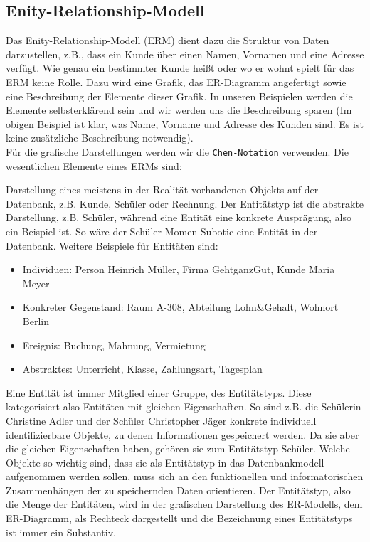 \subsection[Grundlagen]{Enity-Relationship-Modell}
Das Enity-Relationship-Modell (ERM) dient dazu die Struktur von Daten darzustellen, z.B., dass ein Kunde über einen Namen, Vornamen und eine Adresse verfügt. Wie genau ein bestimmter Kunde heißt oder wo er wohnt spielt für das ERM keine Rolle. Dazu wird eine Grafik, das ER-Diagramm angefertigt sowie eine Beschreibung der Elemente dieser Grafik. In unseren Beispielen werden die Elemente selbsterklärend sein und wir werden uns die Beschreibung sparen (Im obigen Beispiel ist klar, was Name, Vorname und Adresse des Kunden sind. Es ist keine zusätzliche Beschreibung notwendig).\\
Für die grafische Darstellungen werden wir die \texttt{Chen-Notation} verwenden. Die wesentlichen Elemente eines ERMs sind:
\begin{tcolorbox}[title=Entitätstypen und Entitäten]
	Darstellung eines meistens in der Realität vorhandenen Objekts auf der Datenbank, z.B. Kunde, Schüler oder Rechnung. Der Entitätstyp ist die abstrakte Darstellung, z.B. Schüler, während eine Entität eine konkrete Ausprägung, also ein Beispiel ist. So wäre der Schüler Momen Subotic eine Entität in der Datenbank.
	Weitere Beispiele für Entitäten sind:
	\begin{itemize}
		\item Individuen: Person Heinrich Müller, Firma GehtganzGut, Kunde Maria Meyer
		\item Konkreter Gegenstand: Raum A-308, Abteilung Lohn\&Gehalt, Wohnort Berlin
		\item Ereignis: Buchung, Mahnung, Vermietung
		\item Abstraktes: Unterricht, Klasse, Zahlungsart, Tagesplan
	\end{itemize}
	Eine Entität ist immer Mitglied einer Gruppe, des Entitätstyps. Diese kategorisiert also Entitäten mit gleichen Eigenschaften. So sind z.B. die Schülerin Christine Adler und der Schüler Christopher Jäger konkrete individuell identifizierbare Objekte, zu denen Informationen gespeichert werden. Da sie aber die gleichen Eigenschaften haben, gehören sie zum Entitätstyp Schüler. Welche Objekte so wichtig sind, dass sie als Entitätstyp in das Datenbankmodell aufgenommen werden sollen, muss sich an den funktionellen und informatorischen Zusammenhängen der zu speichernden Daten orientieren.
	Der Entitätstyp, also die Menge der Entitäten, wird in der grafischen Darstellung des ER-Modells, dem ER-Diagramm, als Rechteck dargestellt und die Bezeichnung eines Entitätstyps ist immer ein Substantiv.
\end{tcolorbox}
